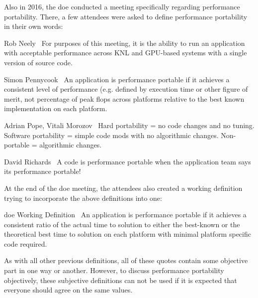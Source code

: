 \newpage
Also in 2016, the \gls{doe} conducted a meeting \cite{neely_doe_2016} specifically regarding performance portability. 
There, a few attendees were asked to define performance portability in their own words:
\begin{quotebox}{Rob Neely~\cite{neely_doe_2016}}
    For purposes of this meeting, it is the ability to run an application with acceptable performance across KNL and GPU-based systems with a single version of source code.
\end{quotebox}
\begin{quotebox}{Simon Pennycook~\cite{neely_doe_2016}}
    An application is performance portable if it achieves a consistent level of performance (e.g. defined by execution time or other figure of merit, not percentage of peak flops across platforms relative to the best known implementation on each platform.
\end{quotebox}
\begin{quotebox}{Adrian Pope, Vitali Morozov~\cite{neely_doe_2016}}
    Hard portability = no code changes and no tuning. Software portability = simple code mods with no algorithmic changes. Non-portable = algorithmic changes.
\end{quotebox}
\begin{quotebox}{David Richards~\cite{neely_doe_2016}}
    A code is performance portable when the application team says its performance portable!
\end{quotebox}

At the end of the \gls{doe} meeting, the attendees also created a working definition trying to incorporate the above definitions into one: 
\begin{quotebox}{\gls{doe} Working Definition~\cite{doe_meeting_attendees_definition_nodate}}
    An application is performance portable if it achieves a consistent ratio of the actual time to solution to either the best-known or the theoretical best time to solution on each platform with minimal platform specific code required.
\end{quotebox} %

As with all other previous definitions, all of these quotes contain some objective part in one way or another.
However, to discuss performance portability objectively, these subjective definitions can not be used if it is expected that everyone should agree on the same values. 


\newpage
\cite{hoefler_scientific_2015}

